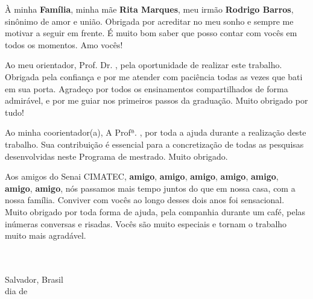 
\begin{agradecimentos}

À minha \textbf{Família}, minha mãe \textbf{Rita Marques}, meu irmão
\textbf{Rodrigo Barros}, sinônimo de amor e união. Obrigada por acreditar
no meu sonho e sempre me motivar a seguir em frente. É muito bom saber que
posso contar com vocês em todos os momentos. Amo vocês!

Ao meu orientador, Prof. Dr. \textbf{\theadvisor}, pela
oportunidade de realizar este trabalho. Obrigada pela confiança e por me
atender com paciência todas as vezes que bati em sua porta. Agradeço por
todos os ensinamentos compartilhados de forma admirável, e por me guiar nos
primeiros passos da graduação. Muito obrigado por tudo!

Ao minha coorientador(a), A Profª. \textbf{\thecoadvisor}, por
toda a ajuda durante a realização deste trabalho. Sua contribuição é essencial
para a concretização de todas as pesquisas desenvolvidas neste Programa de
mestrado. Muito obrigado.

Aos amigos do Senai CIMATEC, \textbf{amigo}, \textbf{amigo}, \textbf{amigo},
\textbf{amigo}, \textbf{amigo}, \textbf{amigo}, \textbf{amigo}, nós passamos
mais tempo juntos do que em nossa casa, com a nossa família. Conviver com
vocês ao longo desses dois anos foi sensacional. Muito obrigado por toda
forma de ajuda, pela companhia durante um café, pelas inúmeras conversas e
risadas. Vocês são muito especiais e tornam o trabalho muito mais agradável.
\cleardoublepage

\ \\
\ \\

\noindent
Salvador, Brasil \hfill \theauthor\\
dia de \mesdeano
\end{agradecimentos}
